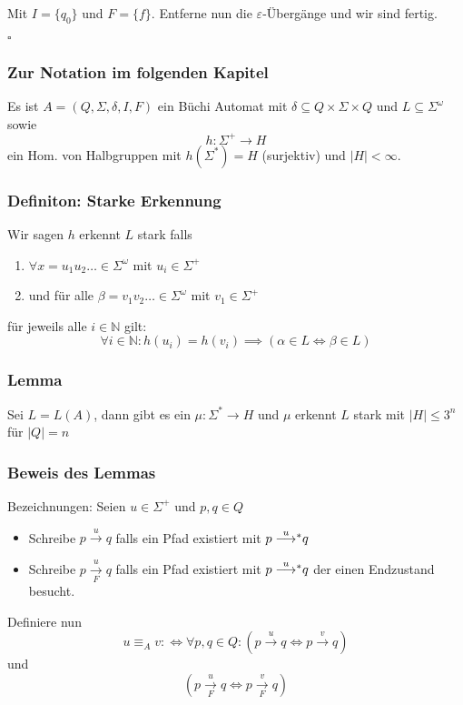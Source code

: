 \documentclass[12pt, german]{article}
\def\ttostar#1{\overset{#1}{\longrightarrow}\negthickspace^*}
\def\tto#1{\overset{#1}{\longrightarrow}}
\def\ttou#1#2{ \overset{#1}{\underset{#2}{\longrightarrow}}}
\newcommand{\N}{\mathbb{N}}
\newcommand{\sigstern}{\Sigma^\ast}
\newcommand{\pom}{^{\omega}}
\newcommand{\bewiesen}{
	
	\begin{flushright}
		$\square$  \\
\end{flushright}}
\begin{document}
	Mit $I=\{q_0\}$ und $F= \{f\}$. Entferne nun die $\varepsilon$-Übergänge und wir sind fertig.
	\bewiesen
	
\subsubsection{Zur Notation im folgenden Kapitel}
	Es ist $A = (Q, \Sigma, \delta, I,F)$ ein Büchi Automat mit $\delta \subseteq Q \times\Sigma \times Q$ und $L \subseteq \Sigma\pom$ sowie $$h:\Sigma^+ \to H$$ ein Hom. von Halbgruppen mit $h(\sigstern) = H$ (surjektiv) und $|H| < \infty$. 
	
\subsubsection{Definiton: Starke Erkennung}
	Wir sagen $h$ erkennt $L$ stark falls 
	\begin{enumerate}[label=\arabic*)]
	\item $\forall x = u_1u_2\ldots \in \Sigma\pom$ mit $u_i \in \Sigma^+$
	\item und für alle $\beta = v_1v_2 \ldots \in \Sigma\pom$ mit $v_1 \in \Sigma^+$ 
	\end{enumerate}
	für jeweils alle $i \in \N$ gilt: $$\forall i \in \N: h(u_i) = h(v_i) \implies (\alpha \in L \iff \beta \in L)$$

\subsubsection{Lemma}
	Sei $L=L(A)$, dann gibt es ein $\mu : \sigstern \to H$ und $\mu$ erkennt $L$ stark mit $|H| \leq 3^n$ für $|Q| = n$

\subsubsection{Beweis des Lemmas}
	Bezeichnungen: Seien $u \in \Sigma^+$ und $p, q \in Q$
	 \begin{itemize}
		\item  Schreibe $p \tto{u} q$ falls ein Pfad existiert mit $p \ttostar{u} q$
		\item Schreibe $p \ttou{u}{F} q$ falls ein Pfad existiert mit $p \ttostar{u} q$ der einen Endzustand besucht.
	\end{itemize}
	Definiere nun $$u \equiv_A v :\iff \forall p, q \in Q : (p \tto{u} q \iff p \tto{v} q)$$ und 
	$$(p\ttou{u}{F} q \iff p \ttou{v}{F} q)$$
	\newline
	
\end{document}
